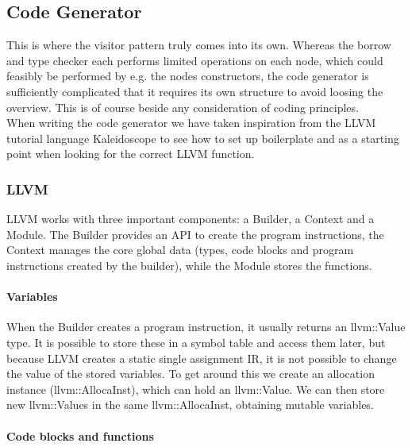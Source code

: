 \subsection{Code Generator}
\label{sec:CodeGenImplement}
This is where the visitor pattern truly comes into its own. Whereas the borrow and type checker each performs limited operations on each node, which could feasibly be performed by e.g. the nodes constructors, the code generator is sufficiently complicated that it requires its own structure to avoid loosing the overview. This is of course beside any consideration of coding principles.\\
When writing the code generator we have taken inspiration from the LLVM tutorial language Kaleidoscope \cite{LLVMTutorial} to see how to set up boilerplate and as a starting point when looking for the correct LLVM function.

\subsubsection{LLVM}
LLVM works with three important components: a Builder, a Context and a Module. The Builder provides an API to create the program instructions, the Context manages the core global data (types, code blocks and program instructions created by the builder), while the Module stores the functions.


\paragraph*{Variables}
When the Builder creates a program instruction, it usually returns an llvm::Value type. It is possible to store these in a symbol table and access them later, but because LLVM creates a static single assignment IR, it is not possible to change the value of the stored variables. To get around this we create an allocation instance (llvm::AllocaInst), which can hold an llvm::Value. We can then store new llvm::Values in the same llvm::AllocaInst, obtaining mutable variables.

\paragraph*{Code blocks and functions}


